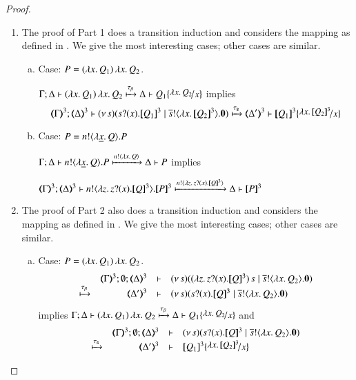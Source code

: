 \begin{proof}
\begin{enumerate}
	\item The proof of Part 1 does a transition induction and
	considers the mapping as defined in .
	We give the most interesting cases; other cases are similar. 

	\begin{enumerate}[a)]
		\item	Case: $P = (\lambda x.\,Q_1)\, {\lambda x.\,Q_2}$.

			$\horel{\Gamma}{\Delta}{\appl{(\abs{x}{Q_1})}{\abs{x}{Q_2}}}{\hby{\btau}}{\Delta}{Q_1 \subst{\abs{x}{Q_2}}{x}}$ implies
\[
			\horel{\tmap{\Gamma}{3}}{\tmap{\Delta}{3}}{\newsp{s}{\binp{s}{x} \pmap{Q_1}{3} \Par \bout{\dual{s}}{\abs{x}{\pmap{Q_2}{3}}} \inact}}{\hby{\stau}}
			{\tmap{\Delta'}{3}}{\pmap{Q_1}{3} \subst{\abs{x}{\pmap{Q_2}{3}}}{x}}
\]

		\item	Case: $P = n ! \langle \lambda \underline{x}.\,Q \rangle . P$

			$\Gamma; \Delta \vdash n ! \langle \lambda \underline{x}.\,Q \rangle . P \xmapsto{ n !\langle \lambda x.\,Q \rangle} \Delta \vdash P$ implies

			$\horel{\tmap{\Gamma}{3}}{\tmap{\Delta}{3}}{\bout{n}{\abs{z} \binp{z}{x} \pmap{Q}{3}} \pmap{P}{3}}{\hby{ \bactout{n}{\abs{z}{\binp{z}{x} \pmap{Q}{3}} } }}{\Delta}{\pmap{P}{3}}$

	\end{enumerate}

	\item The proof of Part 2 also does a transition induction and
	considers the mapping as defined in .
	We give the most interesting cases; other cases are similar. 

	\begin{enumerate}[a)]
		\item	Case: $P = (\lambda x.\,Q_1)\, {\lambda x.\,Q_2}$.
%
		\[
			\mhorel{\tmap{\Gamma}{3}}{\tmap{\Delta}{3}}{\newsp{s}{ \appl{(\abs{z}\binp{z}{x} \pmap{Q}{3})}{s}  \Par \bout{\dual{s}}{\abs{x}{Q_2}} \inact}}{\hby{\btau}}
			{\tmap{\Delta'}{3}}{}{\newsp{s}{\binp{s}{x} \pmap{Q}{3}  \Par \bout{\dual{s}}{\abs{x}{Q_2}} \inact}}
		\]
%
			\noi implies
			$\horel{\Gamma}{\Delta}{\appl{(\abs{x}{Q_1})}{\abs{x}{Q_2}}}{\hby{\btau}}{\Delta}{Q_1 \subst{\abs{x}{Q_2}}{x}}$ and
%
		\[
			\mhorel{\tmap{\Gamma}{3}}{\tmap{\Delta}{3}}{\newsp{s}{\binp{s}{x} \pmap{Q}{3}  \Par \bout{\dual{s}}{\abs{x}{Q_2}} \inact}}{\hby{\stau}}
			{\tmap{\Delta'}{3}}{}{\pmap{Q_1}{3} \subst{\abs{x}{\pmap{Q_2}{3}}}{x}}
		\]


\end{enumerate}
\end{enumerate}
\end{proof}
